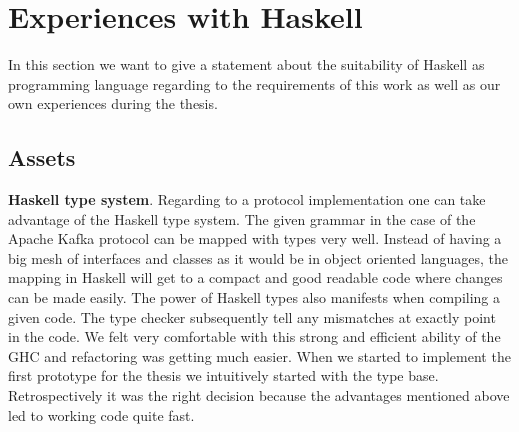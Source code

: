 
\newpage
\section{Experiences with Haskell}
In this section we want to give a statement about the suitability of Haskell
as programming language regarding to the requirements of this work as well as
our own experiences during the thesis. 

\subsection{Assets}
{\bf Haskell type system}. Regarding to a protocol implementation one can take
advantage of the Haskell type system. The given grammar in the case of the
Apache Kafka protocol can be mapped with types very well. Instead of having a
big mesh of interfaces and classes as it would be in object oriented languages,
the mapping in Haskell will get to a compact and good readable code where
changes can be made easily. The power of Haskell types also manifests when
compiling a given code. The type checker subsequently tell any mismatches at
exactly point in the code. We felt very comfortable with this strong and
efficient ability of the GHC and refactoring was getting much easier. When we
started to implement the first prototype for the thesis we intuitively started
with the type base. Retrospectively it was the right decision because the
advantages mentioned above led to working code quite fast.

